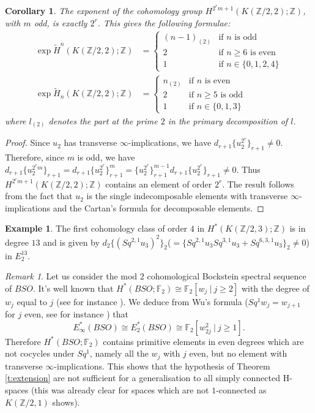 \documentclass[11pt,a4paper]{amsart}
\theoremstyle{plain}
\newtheorem{cor}[thm]{Corollary}
\theoremstyle{definition}
\newtheorem{exmp}{Example}[section]
\theoremstyle{remark}
\newtheorem*{rem}{Remark}
\newcommand{\Z}{\mathbb{Z}}
\newcommand{\F}{\mathbb{F}}
\renewcommand{\geq}{\geqslant}
\begin{document}
\begin{cor}
The exponent of the cohomology group $H^{2^r m+1}(K(\Z/2,2);\Z)$, with $m$ odd, is exactly $2^r$. This gives the following formulae:
\begin{align*}
\exp\widetilde{H}^n(K(\Z/2,2);\Z)&=\begin{cases}(n-1)_{(2)}&\text{if $n$ is odd}\\ 2&\text{if $n\geq6$ is even}\\1&\text{if $n\in\{0,1,2,4\}$}\end{cases}\\
\exp\widetilde{H}_n(K(\Z/2,2);\Z)&=\begin{cases}n_{(2)}&\text{if $n$ is even}\\ 2&\text{if $n\geq5$ is odd}\\1&\text{if $n\in\{0,1,3\}$}\end{cases}
\end{align*} 
where $l_{(2)}$ denotes the part at the prime $2$ in the primary decomposition of $l$.
\end{cor}

\begin{proof}
Since $u_2$ has transverse $\infty$-implications, we have $d_{r+1}\{u_2^{2^r}\}_{r+1}\not=0$. Therefore, since $m$ is odd, we have $d_{r+1}\{u_2^{2^rm}\}_{r+1}=d_{r+1}\{u_2^{2^r}\}_{r+1}^m=\{u_2^{2^r}\}_{r+1}^{m-1}d_{r+1}\{u_2^{2^r}\}_{r+1}\not=0$. Thus $H^{2^r m+1}(K(\Z/2,2);\Z)$ contains an element of order $2^r$. The result follows from the fact that $u_2$ is the single indecomposable elements with transverse $\infty$-implications and the Cartan's formula for decomposable elements.
\end{proof}

\begin{exmp}
The first cohomology class of order $4$ in $H^*(K(\Z/2,3);\Z)$ is in degree $13$ and is given by $d_2\{(Sq^{2,1}u_3)^2\}_2$($=\{Sq^{2,1}u_3Sq^{3,1}u_3+Sq^{6,3,1}u_3\}_2\not=0$) in $E_2^{13}$.
\end{exmp}

\begin{rem}
Let us consider the mod $2$ cohomological Bockstein spectral sequence of $BSO$. It's well known that $H^*(BSO;\F_2)\cong\F_2[w_j\ |\ j\geq2]$ with the degree of $w_j$ equal to $j$ (see for instance \cite[p. 216]{Mc-00}). We deduce from Wu's formula ($Sq^1w_j=w_{j+1}$ for $j$ even, see for instance \cite[Part I, p. 138]{MT-91}) that 
$$
E_\infty^*(BSO)\cong E_2^*(BSO)\cong \F_2[w_{2j}^2\ |\ j\geq1].
$$ Therefore $H^*(BSO;\F_2)$ contains primitive elements in even degrees which are not cocycles under $Sq^1$, namely all the $w_j$ with $j$ even, but no element with transverse $\infty$-implications. This shows that the hypothesis of Theorem \ref{t:extension} are not sufficient for a generalisation to all simply connected H-spaces (this was already clear for spaces which are not $1$-connected as $K(\Z/2,1)$ shows).
\end{rem}
\end{document}

